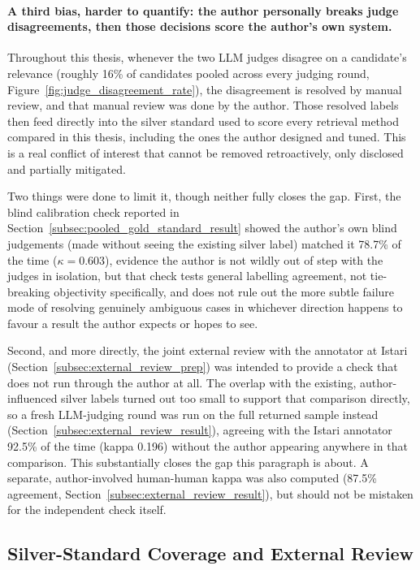 \documentclass[a4paper,oneside,bibliography=totoc]{scrbook}
\begin{document}
\paragraph{A third bias, harder to quantify: the author personally breaks judge disagreements, then those decisions score the author's own system.} Throughout this thesis, whenever the two LLM judges disagree on a candidate's relevance (roughly 16\% of candidates pooled across every judging round, Figure~\ref{fig:judge_disagreement_rate}), the disagreement is resolved by manual review, and that manual review was done by the author. Those resolved labels then feed directly into the silver standard used to score every retrieval method compared in this thesis, including the ones the author designed and tuned. This is a real conflict of interest that cannot be removed retroactively, only disclosed and partially mitigated.

Two things were done to limit it, though neither fully closes the gap. First, the blind calibration check reported in Section~\ref{subsec:pooled_gold_standard_result} showed the author's own blind judgements (made without seeing the existing silver label) matched it 78.7\% of the time ($\kappa = 0.603$), evidence the author is not wildly out of step with the judges in isolation, but that check tests general labelling agreement, not tie-breaking objectivity specifically, and does not rule out the more subtle failure mode of resolving genuinely ambiguous cases in whichever direction happens to favour a result the author expects or hopes to see.

Second, and more directly, the joint external review with the annotator at Istari (Section~\ref{subsec:external_review_prep}) was intended to provide a check that does not run through the author at all. The overlap with the existing, author-influenced silver labels turned out too small to support that comparison directly, so a fresh LLM-judging round was run on the full returned sample instead (Section~\ref{subsec:external_review_result}), agreeing with the Istari annotator 92.5\% of the time (kappa 0.196) without the author appearing anywhere in that comparison. This substantially closes the gap this paragraph is about. A separate, author-involved human-human kappa was also computed (87.5\% agreement, Section~\ref{subsec:external_review_result}), but should not be mistaken for the independent check itself.

\subsection{Silver-Standard Coverage and External Review}
\label{subsec:external_review_prep_result}
\end{document}
